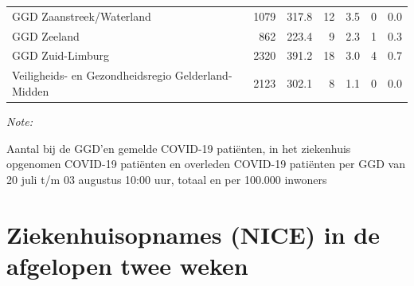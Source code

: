 \documentclass[
  english,
  man,floatsintext]{apa6}
\begin{document}
\begin{table}
\begin{threeparttable}
\begin{tabular}{lrrrrrr}
GGD Zaanstreek/Waterland & 1079 & 317.8 & 12 & 3.5 & 0 & 0.0\\
GGD Zeeland & 862 & 223.4 & 9 & 2.3 & 1 & 0.3\\
GGD Zuid-Limburg & 2320 & 391.2 & 18 & 3.0 & 4 & 0.7\\
Veiligheids- en Gezondheidsregio Gelderland-Midden & 2123 & 302.1 & 8 & 1.1 & 0 & 0.0\\
\bottomrule
\end{tabular}
\begin{tablenotes}
\item \textit{Note: } 
\item Aantal bij de GGD’en gemelde COVID-19 patiënten, in het ziekenhuis opgenomen COVID-19 patiënten en overleden COVID-19 patiënten per GGD van 20 juli t/m 03 augustus 10:00 uur, totaal en per 100.000 inwoners
\end{tablenotes}
\end{threeparttable}
\endgroup{}
\end{table}

\newpage

\hypertarget{ziekenhuisopnames-nice-in-de-afgelopen-twee-weken}{%
\section{Ziekenhuisopnames (NICE) in de afgelopen twee weken}\label{ziekenhuisopnames-nice-in-de-afgelopen-twee-weken}}
\end{document}
